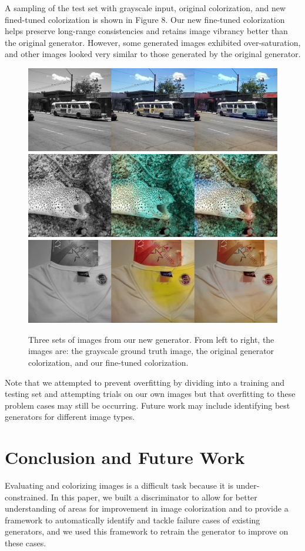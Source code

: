 \documentclass[10pt,twocolumn,letterpaper]{article}
\begin{document}
A sampling of the test set with grayscale input, original colorization, and new fined-tuned colorization is shown in Figure 8. Our new fine-tuned colorization helps preserve long-range consistencies and retains image vibrancy better than the original generator. However, some generated images exhibited over-saturation, and other images looked very similar to those generated by the original generator.

\begin{figure}[htp]

\centering
\includegraphics[width=.45\textwidth]{res_bus.JPG} \\
\includegraphics[width=.45\textwidth]{res_fish.JPG} \\
\includegraphics[width=.45\textwidth]{res_shirt.JPG}
\caption{Three sets of images from our new generator. From left to right, the images are: the grayscale ground truth image, the original generator colorization, and our fine-tuned colorization.}

\end{figure}

Note that we attempted to prevent overfitting by dividing into a training and testing set and attempting trials on our own images but that overfitting to these problem cases may still be occurring. Future work may include identifying best generators for different image types. 

\section{Conclusion and Future Work}

Evaluating and colorizing images is a difficult task because it is under-constrained. In this paper, we built a discriminator to allow for better understanding of areas for improvement in image colorization and to provide a framework to automatically identify and tackle failure cases of existing generators, and we used this framework to retrain the generator to improve on these cases. 
\end{document}

